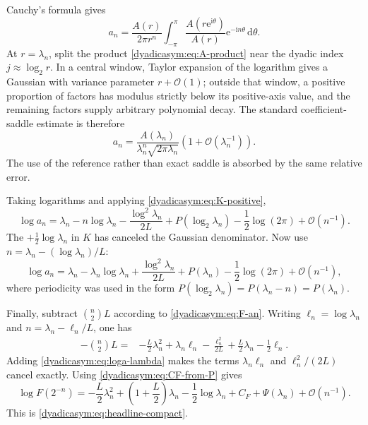 \documentclass[11pt,oneside]{article}
\theoremstyle{definition}
\theoremstyle{remark}
\newcommand{\e}{\mathrm e}
\newcommand{\ii}{\mathrm i}
\newcommand{\dd}{\,\mathrm d}
\newcommand{\bigO}{\mathcal O}
\begin{document}
Cauchy's formula gives
\begin{equation}
 a_n=\frac{A(r)}{2\pi r^n}
 \int_{-\pi}^{\pi}
 \frac{A(r\e^{\ii\theta})}{A(r)}\e^{-\ii n\theta}\dd\theta.
                                                                    \label{dyadicasym:eq:Cauchy-an}
\end{equation}
At $r=\lambda_n$, split the product \eqref{dyadicasym:eq:A-product} near the dyadic index
$j\approx\log_2r$.  In a central window, Taylor expansion of the logarithm gives a Gaussian
with variance parameter $r+\bigO(1)$; outside that window, a positive proportion of factors
has modulus strictly below its positive-axis value, and the remaining factors supply
arbitrary polynomial decay.  The standard coefficient-saddle estimate \cite{dyadicasym:hayman1956,dyadicasym:flajolet2009} is therefore
\begin{equation}
 a_n=\frac{A(\lambda_n)}{\lambda_n^n\sqrt{2\pi\lambda_n}}
 \left(1+\bigO(\lambda_n^{-1})\right).                     \label{dyadicasym:eq:an-saddle}
\end{equation}
The use of the reference rather than exact saddle is absorbed by the same relative error.

Taking logarithms and applying \eqref{dyadicasym:eq:K-positive},
\begin{equation}
 \log a_n=\lambda_n-n\log\lambda_n
 -\frac{\log^2\lambda_n}{2L}
 +P(\log_2\lambda_n)-\frac12\log(2\pi)
 +\bigO(n^{-1}).                                            \label{dyadicasym:eq:loga-pre}
\end{equation}
The $+\tfrac12\log\lambda_n$ in $K$ has canceled the Gaussian denominator.  Now use
$n=\lambda_n-(\log\lambda_n)/L$:
\begin{equation}
 \log a_n=\lambda_n-\lambda_n\log\lambda_n
 +\frac{\log^2\lambda_n}{2L}
 +P(\lambda_n)-\frac12\log(2\pi)
 +\bigO(n^{-1}),                                            \label{dyadicasym:eq:loga-lambda}
\end{equation}
where periodicity was used in the form
$P(\log_2\lambda_n)=P(\lambda_n-n)=P(\lambda_n)$.

Finally, subtract $\binom n2L$ according to \eqref{dyadicasym:eq:F-an}.  Writing
$\ell_n=\log\lambda_n$ and $n=\lambda_n-\ell_n/L$, one has
\begin{align*}
 -\binom n2L
 ={}&-\frac L2\lambda_n^2+\lambda_n\ell_n
 -\frac{\ell_n^2}{2L}+\frac L2\lambda_n-\frac12\ell_n.
\end{align*}
Adding \eqref{dyadicasym:eq:loga-lambda} makes the terms
$\lambda_n\ell_n$ and $\ell_n^2/(2L)$ cancel exactly.  Using
\eqref{dyadicasym:eq:CF-from-P} gives
\begin{equation}
 \log F(2^{-n})=
 -\frac L2\lambda_n^2+
 \left(1+\frac L2\right)\lambda_n-\frac12\log\lambda_n
 +C_F+\Psi(\lambda_n)+\bigO(n^{-1}).                        \label{dyadicasym:eq:saddle-final}
\end{equation}
This is \eqref{dyadicasym:eq:headline-compact}.
\end{document}
